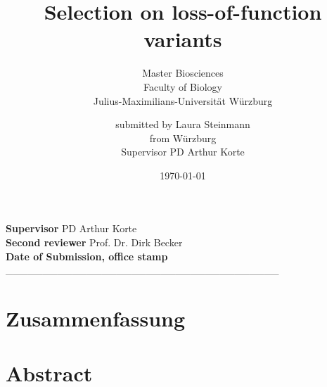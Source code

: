 \documentclass[english,onecolumn,bibliography=totocnumbered]{scrreprt}
\begin{document}
\titlehead{\centering\texttt{[image: CCTB\_Logo.pdf]}}
\title{Selection on loss-of-function variants}
\subject{Master Thesis}
\subtitle{\vspace{1cm}Master Biosciences \\ Faculty of Biology \\ Julius-Maximilians-Universität Würzburg}
\author{submitted by Laura Steinmann \\from Würzburg\\ Supervisor PD Arthur Korte}

\date{\today}


\maketitle
\thispagestyle{empty}
\newpage
\vspace*{\fill}
\begingroup
\centering
\textsf{\textbf{Supervisor} \quad PD Arthur Korte}\\
\vspace{2cm}
\textsf{\textbf{Second reviewer} \quad Prof. Dr. Dirk Becker} \\
\vspace{2cm}
\textsf{\textbf{Date of Submission, office stamp}}\\
\vspace{10mm}
\_\_\_\_\_\_\_\_\_\_\_\_\_\_\_\_\_\_\_\_\_\_\_\_\_\_\_\_\_\_\_\_\_\_\_\_\_\\
\endgroup
\vspace*{{\fill}}
\setcounter{page}{1}
\chapter*{Zusammenfassung}
\chapter*{Abstract}
\newpage
\tableofcontents
{}

\newpage

\newpage

\newpage

\newpage
\appendix
\addtocounter{chapter}{1}
\listoffigures

\printbibliography
\newpage
\end{document}

